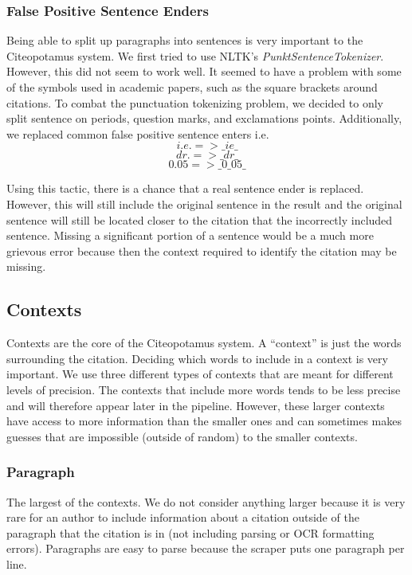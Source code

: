 \documentclass[10pt, conference, compsocconf]{IEEEtran}
\begin{document}
\subsubsection{False Positive Sentence Enders}\label{sec:fpEnders}
Being able to split up paragraphs into sentences is very important to the Citeopotamus system.
We first tried to use NLTK's \textit{PunktSentenceTokenizer}. However, this did not seem to work well.
It seemed to have a problem with some of the symbols used in academic papers, such as the square brackets around
citations. To combat the punctuation tokenizing problem, we decided to only split sentence on periods, question marks, and
exclamations points. Additionally, we replaced common false positive sentence enters i.e.
$$i.e. => \_ie\_$$
$$dr. => \_dr\_$$
$$0.05 => \_0\_05\_$$

Using this tactic, there is a chance that a real sentence ender is replaced. However, this will still
include the original sentence in the result and the original sentence will still be located closer to the
citation that the incorrectly included sentence. Missing a significant portion of a sentence would be a much more
grievous error because then the context required to identify the citation may be missing.

\subsection{Contexts}\label{sec:context}
Contexts are the core of the Citeopotamus system. A ``context'' is just the words surrounding the citation.
Deciding which words to include in a context is very important. We use three different types of contexts that are meant for different
levels of precision. The contexts that include more words tends to be less precise and will therefore appear later in the pipeline.
However, these larger contexts have access to more information than the smaller ones and can sometimes makes guesses that are impossible
(outside of random) to the smaller contexts.

\subsubsection{Paragraph}
The largest of the contexts. We do not consider anything larger because it is very rare for an author to include information about a citation
outside of the paragraph that the citation is in (not including parsing or OCR formatting errors). Paragraphs are easy to parse because the
scraper puts one paragraph per line.
\end{document}

